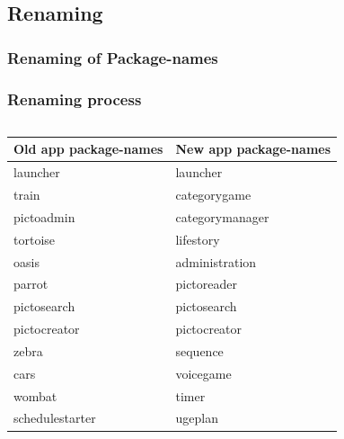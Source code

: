 \subsection{Renaming}
\begin{frame}
	\frametitle{Renaming of Package-names}
\end{frame}

\begin{frame}
	\begin{center}
		\frametitle{Renaming process}
		\begin{columns} %
			\begin{column}{.9\textwidth}
				\begin{tabular}{ll}
					\textbf{Old app package-names} & \textbf{New app package-names}\\ \hline \noalign{\vskip 2mm}
					launcher & launcher\\ \hline
					train & categorygame\\ \hline
					pictoadmin & categorymanager\\ \hline
					tortoise & lifestory\\ \hline
					oasis & administration\\ \hline
					parrot & pictoreader\\ \hline
					pictosearch & pictosearch\\ \hline
					pictocreator & pictocreator\\ \hline
					zebra & sequence\\ \hline
					cars & voicegame\\ \hline
					wombat & timer\\ \hline
					schedulestarter & ugeplan\\ \hline
				\end{tabular}
			\end{column}%
		\end{columns}
	\end{center}
\end{frame}